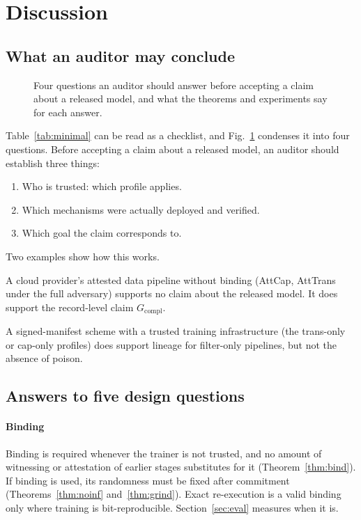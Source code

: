 \section{Discussion}\label{sec:discussion}

\subsection{What an auditor may conclude}

\begin{figure}[t]
\centering
\resizebox{\columnwidth}{!}{}
\caption{Four questions an auditor should answer before accepting a claim about a released
model, and what the theorems and experiments say for each answer.}
\label{fig:auditor}
\end{figure}

Table~\ref{tab:minimal} can be read as a checklist, and Fig.~\ref{fig:auditor} condenses it
into four questions. Before accepting a claim about a
released model, an auditor should establish three things:
\begin{enumerate}
\item Who is trusted: which profile applies.
\item Which mechanisms were actually deployed and verified.
\item Which goal the claim corresponds to.
\end{enumerate}
Two examples show how this works.

A cloud provider's attested data pipeline without binding (\textsf{AttCap}, \textsf{AttTrans}
under the full adversary) supports no claim about the released model. It does support the
record-level claim $G_{\mathrm{compl}}$.

A signed-manifest scheme with a trusted training infrastructure (the trans-only or cap-only
profiles) does support lineage for filter-only pipelines, but not the absence of poison.

\subsection{Answers to five design questions}

\paragraph{Binding}
Binding is required whenever the trainer is not trusted, and no amount of witnessing or
attestation of earlier stages substitutes for it (Theorem~\ref{thm:bind}). If binding is
used, its randomness must be fixed after commitment (Theorems~\ref{thm:noinf}
and~\ref{thm:grind}). Exact re-execution is a valid binding only where training is
bit-reproducible. Section~\ref{sec:eval} measures when it is.

